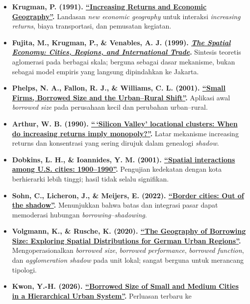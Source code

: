\documentclass[
  indonesian,
  11pt,
  a4paper,
  oneside,
  openany]{report}
\providecommand{\tightlist}{%
  \setlength{\itemsep}{0pt}\setlength{\parskip}{0pt}}
\begin{document}
\begin{itemize}
\tightlist
\item
  \textbf{Krugman, P. (1991).
  \href{https://doi.org/10.1086/261763}{``Increasing Returns and
  Economic Geography''}.} Landasan \emph{new economic geography} untuk
  interaksi \emph{increasing returns}, biaya transportasi, dan pemusatan
  kegiatan.
\item
  \textbf{Fujita, M., Krugman, P., \& Venables, A. J. (1999).
  \href{https://mitpress.mit.edu/9780262561471/the-spatial-economy/}{\emph{The
  Spatial Economy: Cities, Regions, and International Trade}}.} Sintesis
  teoretis aglomerasi pada berbagai skala; berguna sebagai dasar
  mekanisme, bukan sebagai model empiris yang langsung dipindahkan ke
  Jakarta.
\item
  \textbf{Phelps, N. A., Fallon, R. J., \& Williams, C. L. (2001).
  \href{https://doi.org/10.1080/00343400120075885}{``Small Firms,
  Borrowed Size and the Urban--Rural Shift''}.} Aplikasi awal
  \emph{borrowed size} pada perusahaan kecil dan perubahan urban--rural.
\item
  \textbf{Arthur, W. B. (1990).
  \href{https://doi.org/10.1016/0165-4896(90)90064-E}{``\,`Silicon
  Valley' locational clusters: When do increasing returns imply
  monopoly?''}.} Latar mekanisme increasing returns dan konsentrasi yang
  sering dirujuk dalam genealogi \emph{shadow}.
\item
  \textbf{Dobkins, L. H., \& Ioannides, Y. M. (2001).
  \href{https://doi.org/10.1016/S0166-0462(01)00067-9}{``Spatial
  interactions among U.S. cities: 1900--1990''}.} Pengujian kedekatan
  dengan kota berhierarki lebih tinggi; hasil tidak selalu signifikan.
\item
  \textbf{Sohn, C., Licheron, J., \& Meijers, E. (2022).
  \href{https://doi.org/10.1111/pirs.12653}{``Border cities: Out of the
  shadow''}.} Menunjukkan bahwa batas dan integrasi pasar dapat
  memoderasi hubungan \emph{borrowing--shadowing}.
\item
  \textbf{Volgmann, K., \& Rusche, K. (2020).
  \href{https://doi.org/10.1111/tesg.12362}{``The Geography of Borrowing
  Size: Exploring Spatial Distributions for German Urban Regions''}.}
  Mengoperasionalkan \emph{borrowed size}, \emph{borrowed performance},
  \emph{borrowed function}, dan \emph{agglomeration shadow} pada unit
  lokal; sangat berguna untuk merancang tipologi.
\item
  \textbf{Kwon, Y.-H. (2026).
  \href{https://doi.org/10.1111/tesg.70061}{``Borrowed Size of Small and
  Medium Cities in a Hierarchical Urban System''}.} Perluasan terbaru ke

\end{itemize}
\end{document}
